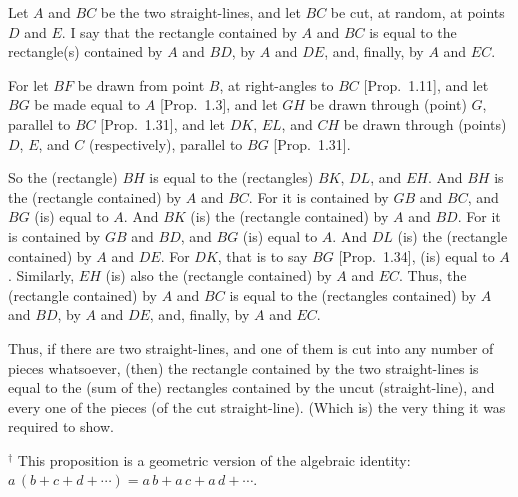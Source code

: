 \begin{Parallel}{}{}
{\epsfysize=2.2in
\centerline{}

Let $A$ and $BC$ be the two straight-lines, and let $BC$ be cut, at random,
at points $D$ and $E$. I say that the rectangle contained by $A$ and $BC$ is equal
to the rectangle(s) contained by $A$ and $BD$, by $A$ and $DE$, and, finally, by $A$ and
$EC$.

For let $BF$ be drawn from point $B$, at right-angles to $BC$ [Prop.~1.11],
and let $BG$ be made equal to $A$ [Prop.~1.3], and let $GH$ be drawn through
(point) $G$, parallel to $BC$ [Prop.~1.31], and let $DK$, $EL$, and $CH$ be drawn through (points) $D$, $E$, and $C$ (respectively), parallel to $BG$ [Prop.~1.31].

So the (rectangle) $BH$ is equal to the (rectangles) $BK$, $DL$, and $EH$. And
$BH$ is  the (rectangle contained) by $A$ and $BC$. For it is contained by $GB$ and $BC$, and $BG$ (is) equal to $A$. And  $BK$ (is) the (rectangle contained) by $A$ and $BD$.
For it is contained by $GB$ and $BD$, and $BG$ (is) equal to $A$. And $DL$ (is) the (rectangle contained) by $A$ and $DE$.
For $DK$, that is to say $BG$ [Prop.~1.34], (is) equal to $A$. Similarly, $EH$ (is)
also the (rectangle contained) by $A$ and $EC$. Thus, the (rectangle contained) by $A$ and $BC$ is
equal to the (rectangles contained) by $A$ and $BD$,  by $A$ and $DE$, and, finally,
by $A$ and $EC$.

Thus, if there are two straight-lines, and one of them is cut into any number 
of pieces whatsoever, (then) the rectangle contained by the two straight-lines is
equal to the (sum of the) rectangles contained by the uncut (straight-line), and every one of the pieces (of the cut straight-line). (Which is) the very thing it was required to show.}
\end{Parallel}
{\footnotesize \noindent$^\dag$ This proposition is a geometric version
of the algebraic identity: $a \,(b+c+d+\cdots) = a\,b + a\,c + a\,d + \cdots$.}


